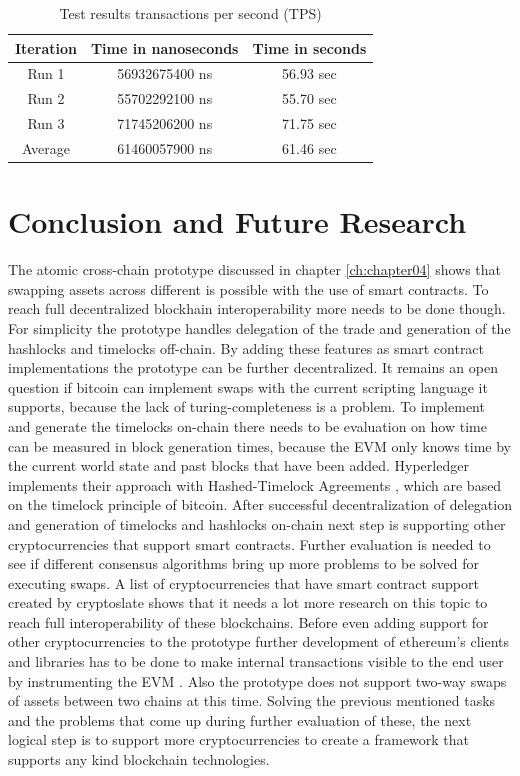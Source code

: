 \begin{table}[h!]
	\centering
	\begin{tabular}{|c | c | c |} 
		\hline 
		Iteration & Time in nanoseconds & Time in seconds \\ [0.5ex] 
		\hline \hline
		Run 1 & 56932675400 ns & 56.93 sec  \\ 
		\hline
		Run 2 & 55702292100 ns & 55.70 sec  \\
		\hline
		Run 3 & 71745206200 ns & 71.75 sec  \\
		\hline
		Average & 61460057900 ns & 61.46 sec  \\ [1ex] 
		\hline
	\end{tabular}
	\caption{Test results transactions per second (TPS)}
	\label{table:4}
\end{table}

\chapter{Conclusion and Future Research}
\label{ch:chapter05}
The atomic cross-chain prototype discussed in chapter \ref{ch:chapter04} shows that swapping assets across different is possible with the use of smart contracts. To reach full decentralized blockhain interoperability more needs to be done though. For simplicity the prototype handles delegation of the trade and generation of the hashlocks and timelocks off-chain. By adding these features as smart contract implementations the prototype can be further decentralized. It remains an open question if bitcoin can implement swaps with the current scripting language it supports, because the lack of turing-completeness is a problem. To implement and generate the timelocks on-chain there needs to be evaluation on how time can be measured in block generation times, because the \ac{EVM} only knows time by the current world state and past blocks that have been added. Hyperledger implements their approach with Hashed-Timelock Agreements \cite{HTLAs}, which are based on the timelock \cite{timelock} principle of bitcoin. After successful decentralization of delegation and generation of timelocks and hashlocks on-chain next step is supporting other cryptocurrencies that support smart contracts. Further evaluation is needed to see if different consensus algorithms bring up more problems to be solved for executing swaps. A list of cryptocurrencies that have smart contract support created by cryptoslate \cite{smart_contract_coins} shows that it needs a lot more research on this topic to reach full interoperability of these blockchains. Before even adding support for other cryptocurrencies to the prototype further development of ethereum's clients and libraries has to be done to make internal transactions visible to the end user by instrumenting the \ac{EVM} \cite{instrumenting_evm}. Also the prototype does not support two-way swaps of assets between two chains at this time. Solving the previous mentioned tasks and the problems that come up during further evaluation of these, the next logical step is to support more cryptocurrencies to create a framework that supports any kind blockchain technologies.

